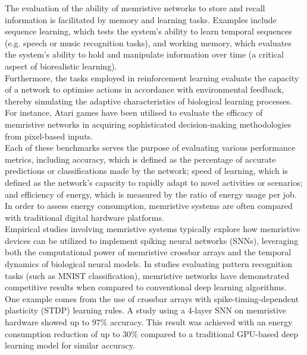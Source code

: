 \noindent The evaluation of the ability of memristive networks to store and recall information is facilitated by memory and learning tasks. Examples include sequence learning, which tests the system's ability to learn temporal sequences (e.g. speech or music recognition tasks), and working memory, which evaluates the system's ability to hold and manipulate information over time (a critical aspect of biorealistic learning). \\

\noindent Furthermore, the tasks employed in reinforcement learning evaluate the capacity of a network to optimise actions in accordance with environmental feedback, thereby simulating the adaptive characteristics of biological learning processes. For instance, Atari games have been utilised to evaluate the efficacy of memristive networks in acquiring sophisticated decision-making methodologies from pixel-based inputs. \\

\noindent Each of these benchmarks serves the purpose of evaluating various performance metrics, including accuracy, which is defined as the percentage of accurate predictions or classifications made by the network; speed of learning, which is defined as the network's capacity to rapidly adapt to novel activities or scenarios; and efficiency of energy, which is measured by the ratio of energy usage per job. In order to assess energy consumption, memristive systems are often compared with traditional digital hardware platforms.\\

\noindent Empirical studies involving memristive systems typically explore how memristive devices can be utilized to implement spiking neural networks (SNNs), leveraging both the computational power of memristive crossbar arrays and the temporal dynamics of biological neural models. In studies evaluating pattern recognition tasks (such as MNIST classification), memristive networks have demonstrated competitive results when compared to conventional deep learning algorithms. \\

\noindent One example comes from the use of crossbar arrays with spike-timing-dependent plasticity (STDP) learning rules. A study using a 4-layer SNN on memristive hardware showed up to 97\% accuracy.  This result was achieved with an energy consumption reduction of up to 30\% compared to a traditional GPU-based deep learning model for similar accuracy. \\

